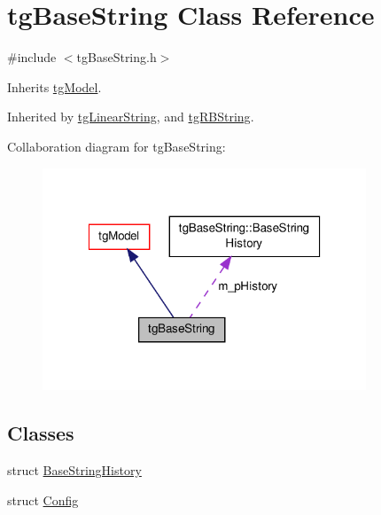 \hypertarget{classtg_base_string}{\section{tg\-Base\-String Class Reference}
\label{classtg_base_string}
}


{\ttfamily \#include $<$tg\-Base\-String.\-h$>$}



Inherits \hyperlink{classtg_model}{tg\-Model}.



Inherited by \hyperlink{classtg_linear_string}{tg\-Linear\-String}, and \hyperlink{classtg_r_b_string}{tg\-R\-B\-String}.



Collaboration diagram for tg\-Base\-String\-:\nopagebreak
\begin{figure}[H]
\begin{center}
\leavevmode
\includegraphics[width=274pt]{classtg_base_string__coll__graph}
\end{center}
\end{figure}
\subsection*{Classes}
\begin{DoxyCompactItemize}
\item 
struct \hyperlink{structtg_base_string_1_1_base_string_history}{Base\-String\-History}
\item 
struct \hyperlink{structtg_base_string_1_1_config}{Config}
\end{DoxyCompactItemize}
